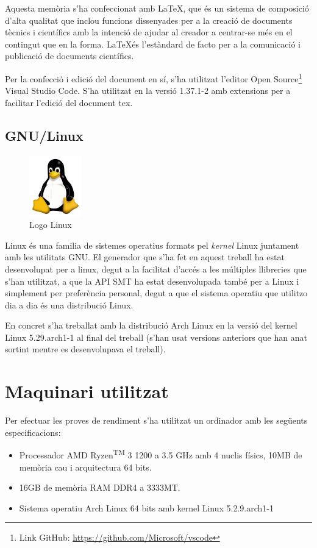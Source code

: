 \documentclass[11pt,a4paper,twoside]{report}
\begin{document}
  Aquesta memòria s'ha confeccionat amb \LaTeX, que és un sistema de composició d'alta qualitat que inclou funcions dissenyades per a la creació de documents tècnics i científics amb la intenció de ajudar al creador a centrar-se més en el contingut que en la forma.
\LaTeX és l'estàndard de facto per a la comunicació i publicació de documents científics. 

Per la confecció i edició del document en sí, s'ha utilitzat l'editor Open Source\footnote{Link GitHub: \url{https://github.com/Microsoft/vscode}} Visual Studio Code. S'ha utilitzat en la versió 1.37.1-2 amb extensions per a facilitar l'edició del document tex.



  \subsection{GNU/Linux}
  \begin{figure}[ht!]
    \centering
    \includegraphics[width=0.2\textwidth]{Diagrames/Linux.png}
    \caption{Logo Linux}
    \label{fig:linux}
  \end{figure}
  Linux és una familia de sistemes operatius formats pel \textit{kernel} Linux juntament amb les utilitats GNU. 
  El generador que s'ha fet en aquest treball ha estat desenvolupat per a linux, degut a la facilitat d'accés a les múltiples llibreries que s'han utilitzat, a que la API SMT ha estat desenvolupada també per a Linux i simplement per preferència personal, degut a que el sistema operatiu que utilitzo dia a dia és una distribució Linux.

  En concret s'ha treballat amb la distribució Arch Linux en la versió del kernel Linux 5.29.arch1-1 al final del treball (s'han usat versions anteriors que han anat sortint mentre es desenvolupava el treball).


  \section{Maquinari utilitzat}
  Per efectuar les proves de rendiment s'ha utilitzat un ordinador amb les següents especificacions:
  \begin{itemize}
    \item Processador AMD Ryzen\textsuperscript{TM} 3 1200 a 3.5 GHz amb 4 nuclis físics,  10MB de memòria cau i arquitectura 64 bits.
    \item 16GB de memòria RAM DDR4 a 3333MT.
    \item Sistema operatiu Arch Linux 64 bits amb kernel Linux 5.2.9.arch1-1
  \end{itemize} 
  
\end{document}
